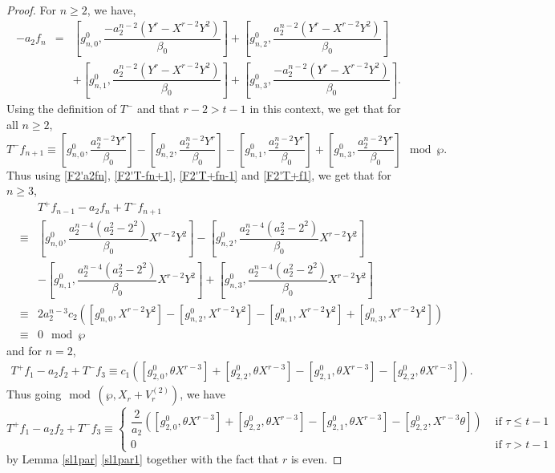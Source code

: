 \documentclass[11pt, reqno]{amsart}
\numberwithin{equation}{section}
\theoremstyle{definition}
\theoremstyle{remark}
\theoremstyle{definition}
\theoremstyle{remark}
\theoremstyle{remark}
\begin{document}
\begin{proof}
For $n\geq 2$, we have,
\begin{eqnarray}\label{F2'a2fn}
-a_{2}f_{n}& = &\left[g_{n,0}^{0}, \dfrac{-a_{2}^{n-2}(Y^{r}-X^{r-2}Y^{2} )}{\beta_{0}}\right] +  \left[g_{n,2}^{0}, \dfrac{a_{2}^{n-2}(Y^{r}-X^{r-2}Y^{2})}{\beta_{0}}\right] \nonumber\\
&&+ \left[g_{n,1}^{0},\dfrac{a_{2}^{n-2}(Y^{r}-X^{r-2}Y^{2})}{\beta_{0}}\right] + \left[g_{n,3}^{0},\dfrac{-a_{2}^{n-2}(Y^{r}-X^{r-2}Y^{2})}{\beta_{0}}\right].
\end{eqnarray}%
Using the definition of $T^-$ and that $r-2>t-1$ in this context, we get that for all $n\geq2$,
\begin{equation}\label{F2'T-fn+1}
T^{-}f_{n+1} \equiv \left[g_{n,0}^{0}, \dfrac{a_{2}^{n-2}Y^{r}}{\beta_{0}}\right] -\left[g_{n,2}^{0}, \dfrac{a_{2}^{n-2}Y^{r}}{\beta_{0}}\right]-\left[g_{n,1}^{0}, \dfrac{a_{2}^{n-2}Y^{r}}{\beta_{0}}\right]+\left[g_{n,3}^{0}, \dfrac{a_{2}^{n-2}Y^{r}}{\beta_{0}}\right] \mod\wp.
\end{equation}
 Thus using \eqref{F2'a2fn}, \eqref{F2'T-fn+1}, \eqref{F2'T+fn-1} and \eqref{F2'T+f1}, we get that for $n\geq 3$, \begin{eqnarray}\label{sl1F2'radn}
& &T^{+}f_{n-1}-a_{2}f_{n}+T^{-}f_{n+1}  \nonumber \\
 &\equiv&
\left[g_{n,0}^{0},\dfrac {a_{2}^{n-4}(a_{2}^2-2^2)}{\beta_{0}}X^{r-2}Y^2 \right]
-\left[g_{n,2}^{0},\dfrac {a_{2}^{n-4}(a_{2}^2-2^2)}{\beta_{0}}X^{r-2}Y^2\right]  \nonumber\\
 & &  -\left[g_{n,1}^{0},\dfrac {a_{2}^{n-4}(a_{2}^2-2^2)}{\beta_{0}}X^{r-2}Y^2\right]+\left[g_{n,3}^{0},\dfrac {a_{2}^{n-4}(a_{2}^2-2^2)}{\beta_{0}}X^{r-2}Y^2\right]  \nonumber\\
 & \equiv& 2a_{2}^{n-3}c_{2}\left(\left[g_{n,0}^{0}, X^{r-2}Y^2 \right]-\left[g_{n,2}^{0}, X^{r-2}Y^2\right] -\left[g_{n,1}^{0}, X^{r-2}Y^2\right]+\left[g_{n,3}^{0}, X^{r-2}Y^2\right] \right)  \nonumber\\
& \equiv& 0 \mod \wp 
\end{eqnarray}
and for $n=2$,
\begin{eqnarray*}
 T^{+}f_{1}-a_{2}f_{2}+T^{-}f_{3}\equiv c_{1}\left(\left[g_{2,0}^0, \theta X^{r-3}\right] + \left[g_{2,2}^0, \theta X^{r-3}\right] -\left[g_{2,1}^0, \theta X^{r-3} \right]-\left[g_{2,2}^0, \theta X^{r-3} \right]\right).\enspace
\end{eqnarray*}
Thus going$\mod(\wp, X_{r}+V_{r}^{(2)})$, we have
\begin{equation}\label{sl1F2'rad2}   
    T^{+}f_{1}-a_{2}f_{2}+T^{-}f_{3}
\equiv\begin{cases} 
\dfrac{2}{a_{2}}\left([g_{2,0}^0, \theta X^{r-3}] + [g_{2,2}^0, \theta X^{r-3}]-[g_{2,1}^0, \theta X^{r-3}]-[g_{2,2}^0,X^{r-3}\theta]\right)&\text{ if } \tau\leq t-1\\
0 &\text{ if } \tau>t-1
\end{cases}
\end{equation}
by Lemma \ref{sl1par} \eqref{sl1par1} together with the fact that $r$ is even.


\end{proof}
\end{document}
